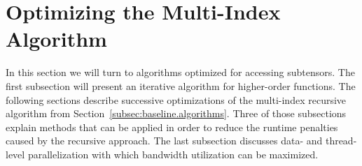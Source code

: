 \section{Optimizing the Multi-Index Algorithm}
\label{sec:optimization}
In this section we will turn to algorithms optimized for accessing subtensors.
The first subsection will present an iterative algorithm for higher-order functions.
The following sections describe successive optimizations of the multi-index recursive algorithm from Section~\ref{subsec:baseline.algorithms}.
Three of those subsections explain methods that can be applied in order to reduce the runtime penalties caused by the recursive approach.
The last subsection discusses data- and thread-level parallelization with which bandwidth utilization can be maximized.

\begin{comment}
\subsection{Iterative Multi-Index Algorithm \textit{\{iter\}}}
The iterative multi-index algorithm accesses elements in ascending order in memory.
It advances from one element to the next by applying an appropriate memory offset.
It is an important observation that the multi-indices $\mathbf i'$ of successive elements contain only one index that is incremented (though others may be reset, as at the end of a matrix row).
Because the elements of a subtensor form a rectangular grid, the offset depends only on which index is being incremented and can therefore be precomputed.
Only for the index with the smallest stride $i_{\pi_1}'$, the offset is that stride, $o_{\pi_1} = w_{\pi_1}'$.
The other offsets can be computed recursively according to:
\begin{equation*}
o_{\pi_r} = w_{\pi_r}' - \sum\limits_{s=1}^{r-1} (n_{\pi_s}'-1) \cdot o_{\pi_s}.
\end{equation*}
Applying this offset amounts to advancing by the stride of the incremented dimension and undoing the offsets applied since its previous incrementation.
\end{comment}


